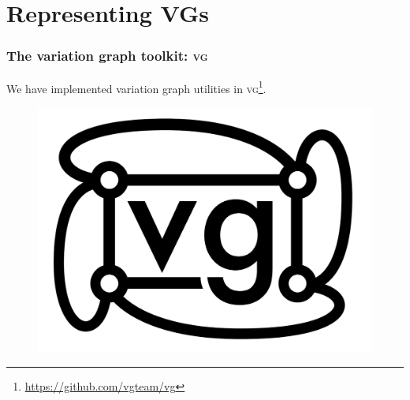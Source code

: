\documentclass{beamer}
\begin{document}
\section{Representing VGs}

\begin{frame}
  \frametitle{The variation graph toolkit: \textsc{vg}}
    We have implemented variation graph utilities in \textsc{vg}\footnote{\url{https://github.com/vgteam/vg}}.
  \begin{figure}
    \includegraphics[scale=0.2,center]{vg_logo.png}
  \end{figure}
\end{frame}
\end{document}
